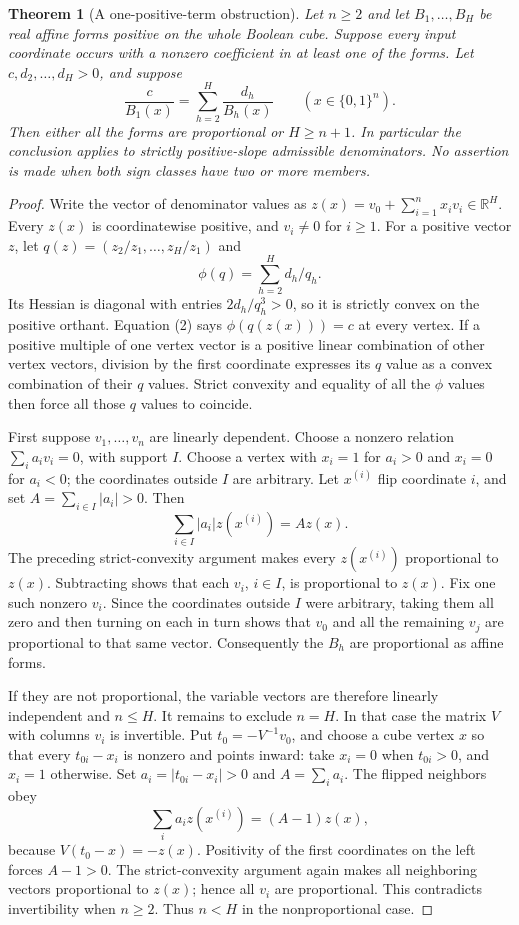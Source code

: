\documentclass[11pt]{article}
\newtheorem{theorem}{Theorem}
\begin{document}
\begin{theorem}[A one-positive-term obstruction]
Let $n\ge2$ and let $B_1,\ldots,B_H$ be real affine forms positive
on the whole Boolean cube. Suppose every input coordinate occurs
with a nonzero coefficient in at least one of the forms. Let
$c,d_2,\ldots,d_H>0$, and suppose
\[
             \frac{c}{B_1(x)}=\sum_{h=2}^H\frac{d_h}{B_h(x)}
                    \qquad(x\in\{0,1\}^n).
 \tag{2}
\]
Then either all the forms are proportional or $H\ge n+1$.
In particular the conclusion applies to strictly positive-slope
admissible denominators. No assertion is made when both sign classes
have two or more members.
\end{theorem}
\begin{proof}
Write the vector of denominator values as
$z(x)=v_0+\sum_{i=1}^n x_i v_i\in\mathbb R^H$.
Every $z(x)$ is coordinatewise positive, and $v_i\ne0$ for $i\ge1$.
For a positive vector $z$, let
$q(z)=(z_2/z_1,\ldots,z_H/z_1)$ and
\[
                   \phi(q)=\sum_{h=2}^H d_h/q_h.
\]
Its Hessian is diagonal with entries $2d_h/q_h^3>0$, so it is
strictly convex on the positive orthant. Equation (2) says
$\phi(q(z(x)))=c$ at every vertex.
If a positive multiple of one vertex vector is a positive linear
combination of other vertex vectors, division by the first
coordinate expresses its $q$ value as a convex combination of
their $q$ values. Strict convexity and equality of all the $\phi$
values then force all those $q$ values to coincide.

First suppose $v_1,\ldots,v_n$ are linearly dependent. Choose a
nonzero relation $\sum_i a_i v_i=0$, with support $I$. Choose a
vertex with $x_i=1$ for $a_i>0$ and $x_i=0$ for $a_i<0$; the
coordinates outside $I$ are arbitrary. Let $x^{(i)}$ flip coordinate
$i$, and set $A=\sum_{i\in I}|a_i|>0$. Then
\[
                 \sum_{i\in I}|a_i|z(x^{(i)})=A z(x).
\]
The preceding strict-convexity argument makes every $z(x^{(i)})$
proportional to $z(x)$. Subtracting shows that each $v_i$, $i\in I$,
is proportional to $z(x)$. Fix one such nonzero $v_i$. Since the
coordinates outside $I$ were arbitrary, taking them all zero and
then turning on each in turn shows that $v_0$ and all the remaining
$v_j$ are proportional to that same vector. Consequently the
$B_h$ are proportional as affine forms.

If they are not proportional, the variable vectors are therefore
linearly independent and $n\le H$. It remains to exclude $n=H$.
In that case the matrix $V$ with columns $v_i$ is invertible. Put
$t_0=-V^{-1}v_0$, and choose a cube vertex $x$ so that every
$t_{0i}-x_i$ is nonzero and points inward: take $x_i=0$ when
$t_{0i}>0$, and $x_i=1$ otherwise. Set
$a_i=|t_{0i}-x_i|>0$ and $A=\sum_i a_i$. The flipped neighbors obey
\[
             \sum_i a_i z(x^{(i)})=(A-1)z(x),
\]
because $V(t_0-x)=-z(x)$. Positivity of the first coordinates on
the left forces $A-1>0$. The strict-convexity argument again makes
all neighboring vectors proportional to $z(x)$; hence all $v_i$
are proportional. This contradicts invertibility when $n\ge2$.
Thus $n<H$ in the nonproportional case.
\end{proof}
\end{document}
